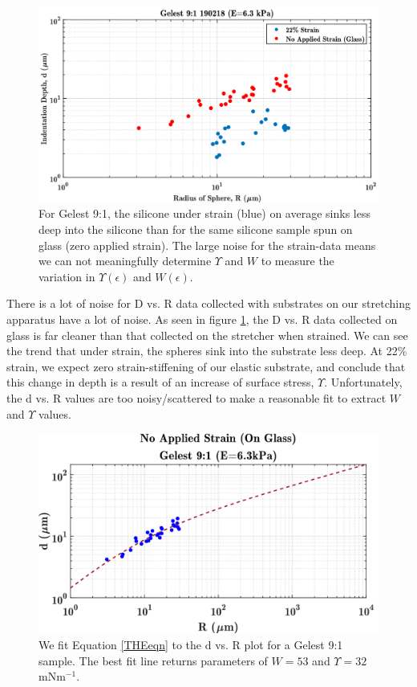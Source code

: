 \begin{figure}[h!]
	\centering
	\includegraphics[width=\linewidth]{Chapters/Figures/g190218_glass_vs_22percent_dvsR.pdf}
	\caption[Glass vs. Stretched d vs. R]{For Gelest 9:1, the silicone under strain (blue) on average sinks less deep into the silicone than for the same silicone sample spun on glass (zero applied strain). The large noise for the strain-data means we can not meaningfully determine $ \Upsilon $ and $ W $ to measure the variation in $ \Upsilon(\epsilon)$ and $W(\epsilon)$.}
	\label{fig:glassvsstretched190218}
\end{figure}

There is a lot of noise for D vs. R data collected with substrates on our stretching apparatus have a lot of noise. As seen in figure \ref{fig:glassvsstretched190218}, the D vs. R data collected on glass is far cleaner than that collected on the stretcher when strained. We can see the trend that under strain, the spheres sink into the substrate less deep. At 22\% strain, we expect zero strain-stiffening of our elastic substrate, and conclude that this change in depth is a result of an increase of surface stress, $ \Upsilon $. Unfortunately, the d vs. R values are too noisy/scattered to make a reasonable fit to extract $ W $ and $ \Upsilon $ values.



\begin{figure}[h!]
	\centering
	\includegraphics[width=\linewidth]{Chapters/Figures/w_ups_fit_G9-1}
	\caption[Gelest W-$\Upsilon$ Fit]{We fit Equation \ref{THEeqn} to the d vs. R plot for a Gelest 9:1 sample. The best fit line returns parameters of $ W=53 $  and $ \Upsilon=32 $ mNm$^{-1}$.}
	\label{fig:wupsfitg9-1}
\end{figure}

